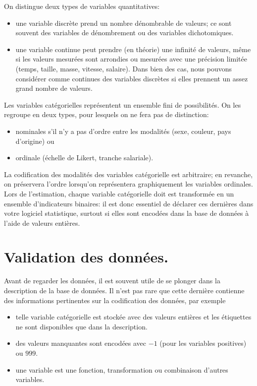 \documentclass[
  11pt,
  letterpaper,
]{book}
\providecommand{\tightlist}{%
  \setlength{\itemsep}{0pt}\setlength{\parskip}{0pt}}\usepackage{longtable,booktabs,array}
\theoremstyle{definition}
\theoremstyle{remark}
\begin{document}
On distingue deux types de variables quantitatives:

\begin{itemize}
\tightlist
\item
  une variable discrète prend un nombre dénombrable de valeurs; ce sont
  souvent des variables de dénombrement ou des variables dichotomiques.
\item
  une variable continue peut prendre (en théorie) une infinité de
  valeurs, même si les valeurs mesurées sont arrondies ou mesurées avec
  une précision limitée (temps, taille, masse, vitesse, salaire). Dans
  bien des cas, nous pouvons considérer comme continues des variables
  discrètes si elles prennent un assez grand nombre de valeurs.
\end{itemize}

Les variables catégorielles représentent un ensemble fini de
possibilités. On les regroupe en deux types, pour lesquels on ne fera
pas de distinction:

\begin{itemize}
\tightlist
\item
  nominales s'il n'y a pas d'ordre entre les modalités (sexe, couleur,
  pays d'origine) ou
\item
  ordinale (échelle de Likert, tranche salariale).
\end{itemize}

La codification des modalités des variables catégorielle est arbitraire;
en revanche, on préservera l'ordre lorsqu'on représentera graphiquement
les variables ordinales. Lors de l'estimation, chaque variable
catégorielle doit est transformée en un ensemble d'indicateurs binaires:
il est donc essentiel de déclarer ces dernières dans votre logiciel
statistique, surtout si elles sont encodées dans la base de données à
l'aide de valeurs entières.

\hypertarget{validation-des-donnuxe9es.}{%
\section{Validation des données.}\label{validation-des-donnuxe9es.}}

Avant de regarder les données, il est souvent utile de se plonger dans
la description de la base de données. Il n'est pas rare que cette
dernière contienne des informations pertinentes sur la codification des
données, par exemple

\begin{itemize}
\tightlist
\item
  telle variable catégorielle est stockée avec des valeurs entières et
  les étiquettes ne sont disponibles que dans la description.
\item
  des valeurs manquantes sont encodées avec \(-1\) (pour les variables
  positives) ou \(999\).
\item
  une variable est une fonction, transformation ou combinaison d'autres
  variables.
\end{itemize}
\end{document}
